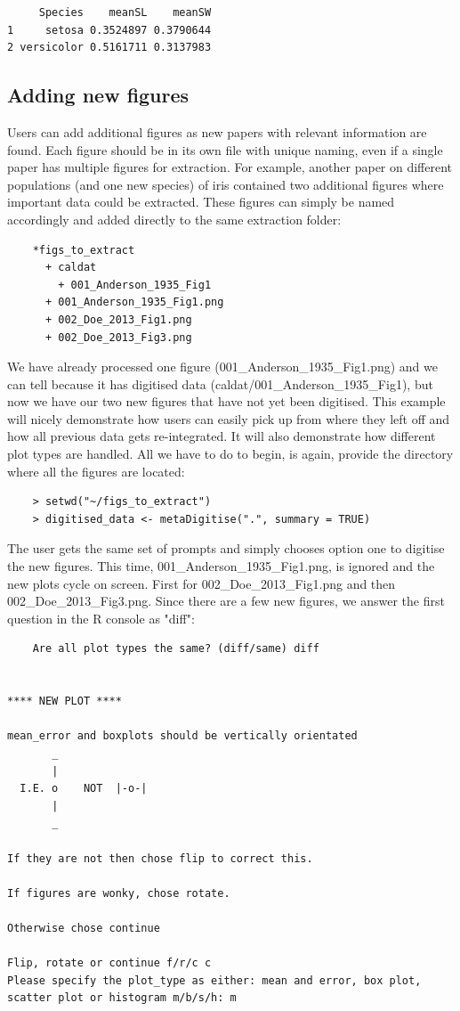 \documentclass{article}
\begin{document}
\begin{lstlisting}
     Species    meanSL    meanSW
1     setosa 0.3524897 0.3790644
2 versicolor 0.5161711 0.3137983
\end{lstlisting}

\subsection{Adding new figures}

Users can add additional figures as new papers with relevant information are found. Each figure should be in its own file with unique naming, even if a single paper has multiple figures for extraction. For example, another paper on different populations (and one new species) of iris contained two additional figures where important data could be extracted. These figures can simply be named accordingly and added directly to the same extraction folder: 

\begin{lstlisting}
	*figs_to_extract
	  + caldat
	  	+ 001_Anderson_1935_Fig1
      + 001_Anderson_1935_Fig1.png
      + 002_Doe_2013_Fig1.png
      + 002_Doe_2013_Fig3.png
\end{lstlisting}

We have already processed one figure (001\_Anderson\_1935\_Fig1.png) and we can tell because it has digitised data (caldat/001\_Anderson\_1935\_Fig1), but now we have our two new figures that have not yet been digitised. This example will nicely demonstrate how users can easily pick up from where they left off and how all previous data gets re-integrated. It will also demonstrate how different plot types are handled. All we have to do to begin, is again, provide the directory where all the figures are located:

\begin{verbatim}
	> setwd("~/figs_to_extract")
	> digitised_data <- metaDigitise(".", summary = TRUE)
\end{verbatim}

The user gets the same set of prompts and simply chooses option one to digitise the new figures. This time, 001\_Anderson\_1935\_Fig1.png, is ignored and the new plots cycle on screen. First for 002\_Doe\_2013\_Fig1.png and then 002\_Doe\_2013\_Fig3.png. Since there are a few new figures, we answer the first question in the R console as "diff":

\begin{lstlisting}
	Are all plot types the same? (diff/same) diff


**** NEW PLOT ****

mean_error and boxplots should be vertically orientated
       _ 
       |  
  I.E. o    NOT  |-o-|
       |
       _

If they are not then chose flip to correct this.

If figures are wonky, chose rotate.

Otherwise chose continue

Flip, rotate or continue f/r/c c
Please specify the plot_type as either: mean and error, box plot, scatter plot or histogram m/b/s/h: m
\end{lstlisting}
\end{document}
